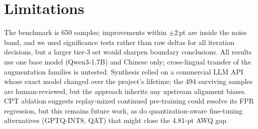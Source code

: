 \documentclass[11pt]{article}
\begin{document}
\section*{Limitations}

The benchmark is 650 samples; improvements within $\pm$2\,pt are inside the noise band, and we used significance tests rather than raw deltas for all iteration decisions, but a larger tier-3 set would sharpen boundary conclusions. All results use one base model (Qwen3-1.7B) and Chinese only; cross-lingual transfer of the augmentation families is untested. Synthesis relied on a commercial LLM API whose exact model changed over the project's lifetime; the 494 surviving samples are human-reviewed, but the approach inherits any upstream alignment biases. CPT ablation suggests replay-mixed continued pre-training could resolve its FPR regression, but this remains future work, as do quantization-aware fine-tuning alternatives (GPTQ-INT8, QAT) that might close the 4.81-pt AWQ gap.


\end{document}
